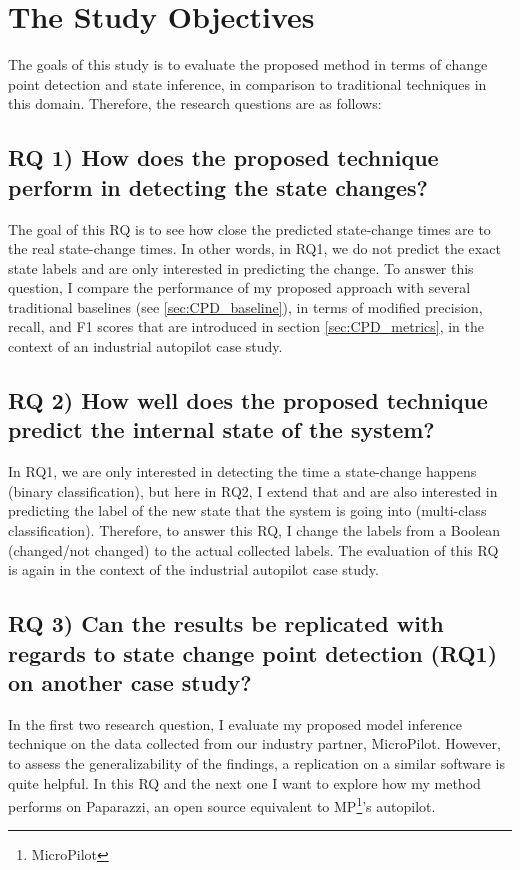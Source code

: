 \section{The Study Objectives}
The goals of this study is to evaluate the proposed method in terms of change point detection and state inference, in comparison to traditional techniques in this domain. Therefore, the research questions are as follows:

\subsection{RQ 1) How does the proposed technique perform in detecting the state changes?}
The goal of this RQ is to see how close the predicted state-change times are to the real state-change times. In other words, in RQ1, we do not predict the exact state labels and are only interested in predicting the change.
To answer this question, I compare the performance of my proposed approach with several traditional baselines (see \ref{sec:CPD_baseline}), in terms of modified precision, recall, and F1 scores that are introduced in section \ref{sec:CPD_metrics}, in the context of an industrial autopilot case study.


\subsection{RQ 2) How well does the proposed technique predict the internal state of the system?}
In RQ1, we are only interested in detecting the time a state-change happens (binary classification), but here in RQ2, I extend that and are also interested in predicting the label of the new state that the system is going into (multi-class classification).  
Therefore, to answer this RQ, I change the labels from a Boolean (changed/not changed) to the actual collected labels. The evaluation of this RQ is again in the context of the industrial autopilot case study.

\subsection{RQ 3) Can the results be replicated with regards to state change point detection (RQ1) on another case study?}
In the first two research question, I evaluate my proposed model inference technique on the data collected from our industry partner, MicroPilot. However, to assess the generalizability of the findings, a replication on a similar software is quite helpful. 
In this RQ and the next one I want to explore how my method performs on Paparazzi, an open source equivalent to MP\footnote{MicroPilot}'s autopilot.

